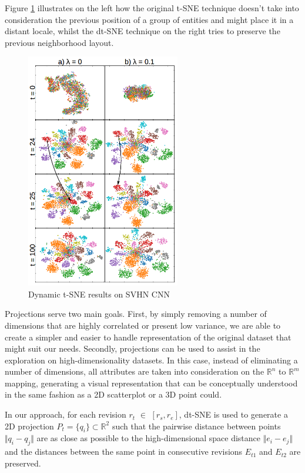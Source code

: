 Figure \ref{fig:dtsne} illustrates on the left how the original t-SNE technique doesn't take into consideration the previous position of a group of entities and might place it in a distant locale, whilst the dt-SNE technique on the right tries to preserve the previous neighborhood layout.
\begin{figure}[H]
  \centering
  \includegraphics[width=0.6\textwidth]{figures/dtsne.png}
  \caption{Dynamic t-SNE results on SVHN CNN}
  \label{fig:dtsne}
\end{figure}

Projections serve two main goals. First, by simply removing a number of dimensions that are highly correlated or present low variance, we are able to create a simpler and easier to handle representation of the original dataset that might suit our needs. Secondly, projections can be used to assist in the exploration on high-dimensionality datasets. In this case, instead of eliminating a number of dimensions, all attributes are taken into consideration on the ${\mathbb{R}^{n}}$ to ${\mathbb{R}^{m}}$ mapping, generating a visual representation that can be conceptually understood in the same fashion as a 2D scatterplot or a 3D point could.

In our approach, for each revision $r_{t}$ $\in$ $[r_{s}, r_{e}]$, dt-SNE is used to generate a 2D projection $P_{t} = \{q_{i} \} \subset{\mathbb{R}^{2}}$ such that the pairwise distance between points $\Vert q_{i} - q_{j} \Vert$ are as close as possible to the high-dimensional space distance $\Vert e_{i} - e_{j} \Vert$ and the distances between the same point in consecutive revisions $E_{t1}$ and $E_{t2}$ are preserved.
